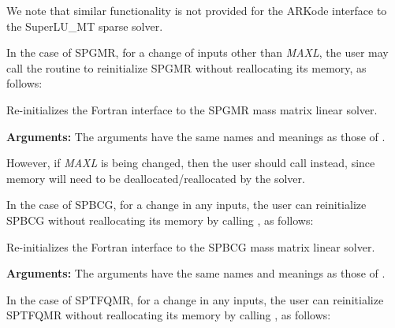\documentclass[letterpaper,10pt,english]{sphinxmanual}
\begin{document}
We note that similar functionality is not provided for the ARKode
interface to the SuperLU\_MT sparse solver.

In the case of SPGMR, for a change of inputs other than \emph{MAXL},
the user may call the routine {\hyperref[f_interface/Usage:f/_/FARKMASSSPGMRREINIT]{\emph{}}} to
reinitialize SPGMR without reallocating its memory, as follows:

\begin{fulllineitems}
\label{f_interface/Usage:f/_/FARKMASSSPGMRREINIT}
Re-initializes the Fortran interface to the SPGMR mass matrix
linear solver.

\textbf{Arguments:}  The arguments have the same names and meanings as
those of {\hyperref[f_interface/Usage:f/_/FARKMASSSPGMR]{\emph{}}}.

\end{fulllineitems}


However, if \emph{MAXL} is being changed, then the user should call
{\hyperref[f_interface/Usage:f/_/FARKMASSSPGMR]{\emph{}}} instead, since memory will need to be
deallocated/reallocated by the solver.

In the case of SPBCG, for a change in any inputs, the user can
reinitialize SPBCG without reallocating its memory by calling
{\hyperref[f_interface/Usage:f/_/FARKMASSSPBCGREINIT]{\emph{}}}, as follows:

\begin{fulllineitems}
\label{f_interface/Usage:f/_/FARKMASSSPBCGREINIT}
Re-initializes the Fortran interface to the SPBCG mass matrix
linear solver.

\textbf{Arguments:}  The arguments have the same names and meanings as
those of {\hyperref[f_interface/Usage:f/_/FARKMASSSPBCG]{\emph{}}}.

\end{fulllineitems}


In the case of SPTFQMR, for a change in any inputs, the user can
reinitialize SPTFQMR without reallocating its memory by calling
{\hyperref[f_interface/Usage:f/_/FARKMASSSPTFQMRREINIT]{\emph{}}}, as follows:
\end{document}
